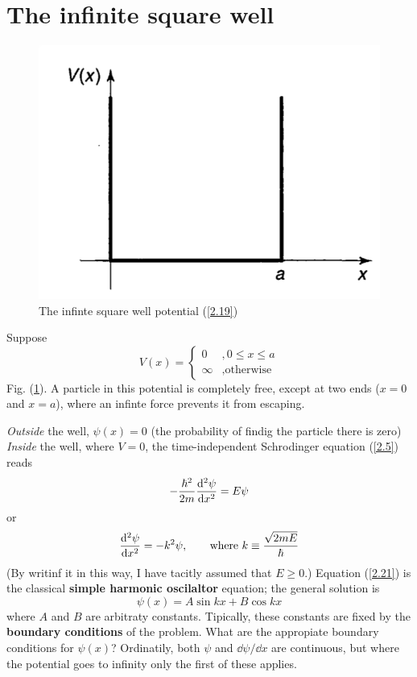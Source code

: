 \section{The infinite square well}
\begin{figure}[h!]
	\begin{center}
		\includegraphics[scale=0.5]{fig/01.png}
		\caption{The infinte square well potential (\ref{2.19})}
		\label{fig:2.1}
	\end{center}	
\end{figure}

Suppose
\begin{equation}\label{2.19}
	V(x)=\left\{\begin{array}{lc}
		0&,0\leq x\leq a\\ \infty & \mbox{,otherwise}\end{array}
		\right.
\end{equation}
Fig. (\ref{fig:2.1}). A particle in this potential is completely free, except at two ends ($x=0$ and $x=a$), where an infinte force prevents it from escaping.

\textit{Outside} the well, $\psi(x)=0$ (the probability of findig the particle there is zero) \textit{Inside} the well, where $V=0$, the time-independent Schrodinger equation (\ref{2.5}) reads
\begin{equation}\label{2.20}
	-\frac{\hbar^2}{2m}\dv[2]{\psi}{x}=E\psi
\end{equation}
or
\begin{equation}\label{2.21}
	\dv[2]{\psi}{x}=-k^2\psi,\qquad \mbox{where } k\equiv\frac{\sqrt{2mE}}{\hbar}
\end{equation}
(By writinf it in this way, I have tacitly assumed that $E\geq 0$.) Equation (\ref{2.21}) is the classical \textbf{simple harmonic oscilaltor} equation; the general solution is
\begin{equation}\label{2.22}
	\psi(x)=A\sin kx + B\cos kx
\end{equation}
where $A$ and $B$ are arbitraty constants. Tipically, these constants are fixed by the \textbf{boundary conditions} of the problem. What are the appropiate boundary conditions for $\psi(x)$? Ordinatily, both $\psi$ and $\dd \psi/\dd x$ are continuous, but where the potential goes to infinity only the first of these applies.

